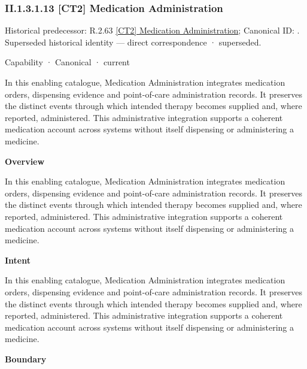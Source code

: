 \subsubsection*{II.1.3.1.13 [CT2] Medication Administration}
\label{navigation:II.1.3.1.13}

{\small Historical predecessor: R.2.63 \hyperref[element:5a38bf2527a8404bac714121f2dc76a9]{[CT2] Medication Administration}; Canonical ID: \texttt{}. Superseded historical identity — direct correspondence · superseded.}\par
\label{element:c907e2a95629435b9951941ad4e2ebe9}
{\small Capability · Canonical · current}\par

In this enabling catalogue, Medication Administration integrates medication orders, dispensing evidence and point-of-care administration records. It preserves the distinct events through which intended therapy becomes supplied and, where reported, administered. This administrative integration supports a coherent medication account across systems without itself dispensing or administering a medicine.



\textbf{Overview}



In this enabling catalogue, Medication Administration integrates medication orders, dispensing evidence and point-of-care administration records. It preserves the distinct events through which intended therapy becomes supplied and, where reported, administered. This administrative integration supports a coherent medication account across systems without itself dispensing or administering a medicine.



\textbf{Intent}



In this enabling catalogue, Medication Administration integrates medication orders, dispensing evidence and point-of-care administration records. It preserves the distinct events through which intended therapy becomes supplied and, where reported, administered. This administrative integration supports a coherent medication account across systems without itself dispensing or administering a medicine.



\textbf{Boundary}



